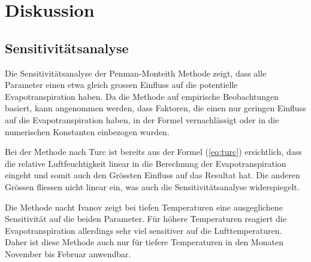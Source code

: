 \section{Diskussion}




\subsection{Sensitivitätsanalyse}
Die Sensitivitätsanalyse der Penman-Monteith Methode zeigt, dass alle Parameter einen etwa gleich grossen Einfluss auf die potentielle Evapotranspiration haben. Da die Methode auf empirische Beobachtungen basiert, kann angenommen werden, dass Faktoren, die einen nur geringen Einfluss auf die Evapotranspiration haben, in der Formel vernachlässigt oder in die numerischen Konstanten einbezogen wurden.

Bei der Methode nach Turc ist bereits aus der Formel (\ref{eq:turc}) ersichtlich, dass die relative Luftfeuchtigkeit linear in die Berechnung der Evapotranspiration eingeht und somit auch den Grössten Einfluss auf das Resultat hat. Die anderen Grössen fliessen nicht linear ein, was auch die Sensitivitätsanalyse widerspiegelt.

Die Methode nacht Ivanov zeigt bei tiefen Temperaturen eine ausgeglichene Sensitivität auf die beiden Parameter. Für höhere Temperaturen reagiert die Evapotranspiration allerdings sehr viel sensitiver auf die Lufttemperaturen. Daher ist diese Methode auch nur für tiefere Temperaturen in den Monaten November bis Februar anwendbar.